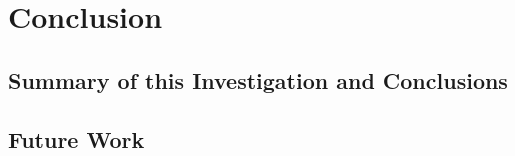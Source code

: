 \chapter{Conclusion}

\section{Summary of this Investigation and Conclusions}

\section{Future Work}